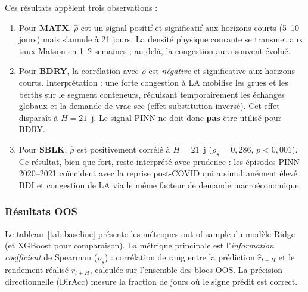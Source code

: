\noindent
Ces résultats appèlent trois observations :

\begin{enumerate}
    \item Pour \textbf{MATX}, $\hat{\rho}$ est un signal positif et significatif
    aux horizons courts (5--10 jours) mais s'annule à 21 jours. La densité
    physique courante se transmet aux taux Matson en 1--2 semaines ; au-delà,
    la congestion aura souvent évolué.

    \item Pour \textbf{BDRY}, la corrélation avec $\hat{\rho}$ est
    \emph{négative} et significative aux horizons courts. Interprétation :
    une forte congestion à LA mobilise les grues et les berths sur le segment
    conteneurs, réduisant temporairement les échanges globaux et la demande
    de vrac sec (effet substitution inversé). Cet effet disparaît à $H = 21$~j.
    Le signal PINN ne doit donc \textbf{pas} être utilisé pour BDRY.

    \item Pour \textbf{SBLK}, $\hat{\rho}$ est positivement corrélé à $H = 21$~j
    ($\rho_s = 0{,}286$, $p < 0{,}001$). Ce résultat, bien que fort, reste
    interprété avec prudence : les épisodes PINN 2020--2021 coïncident avec
    la reprise post-COVID qui a simultanément élevé BDI et congestion de LA
    via le même facteur de demande macroéconomique.
\end{enumerate}

\subsubsection{Résultats OOS}

Le tableau~\ref{tab:baseline} présente les métriques out-of-sample du modèle
Ridge (et XGBoost pour comparaison). La métrique principale est
l'\emph{information coefficient} de Spearman ($\rho_s$) : corrélation de rang
entre la prédiction $\hat{r}_{t+H}$ et le rendement réalisé $r_{t+H}$,
calculée sur l'ensemble des blocs OOS. La précision directionnelle (DirAcc)
mesure la fraction de jours où le signe prédit est correct.

